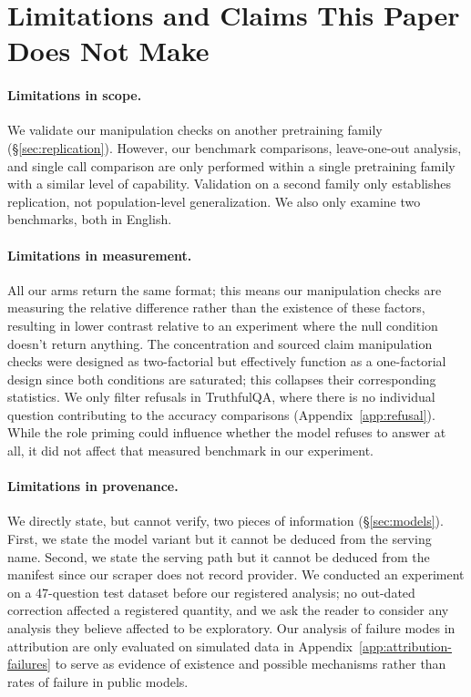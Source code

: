 \section{Limitations and Claims This Paper Does Not Make}
\label{sec:limitations}

\paragraph{Limitations in scope.}
We validate our manipulation checks on another pretraining family (\S\ref{sec:replication}).
However, our benchmark comparisons, leave-one-out analysis, and single call comparison are only
performed within a single pretraining family with a similar level of capability. Validation on a
second family only establishes replication, not population-level generalization. We also only
examine two benchmarks, both in English.

\paragraph{Limitations in measurement.}
All our arms return the same format; this means our manipulation checks are measuring the relative
difference rather than the existence of these factors, resulting in lower contrast relative to an
experiment where the null condition doesn't return anything. The concentration and sourced claim
manipulation checks were designed as two-factorial but effectively function as a one-factorial
design since both conditions are saturated; this collapses their corresponding statistics. We only
filter refusals in TruthfulQA, where there is no individual question contributing to the accuracy
comparisons (Appendix~\ref{app:refusal}). While the role priming could influence whether the model
refuses to answer at all, it did not affect that measured benchmark in our experiment.

\paragraph{Limitations in provenance.}
We directly state, but cannot verify, two pieces of information (\S\ref{sec:models}). First, we
state the model variant but it cannot be deduced from the serving name. Second, we state the serving
path but it cannot be deduced from the manifest since our scraper does not record provider. We
conducted an experiment on a 47-question test dataset before our registered analysis; no out-dated
correction affected a registered quantity, and we ask the reader to consider any analysis they
believe affected to be exploratory. Our analysis of failure modes in attribution are only evaluated
on simulated data in Appendix~\ref{app:attribution-failures} to serve as evidence of existence and
possible mechanisms rather than rates of failure in public models.

